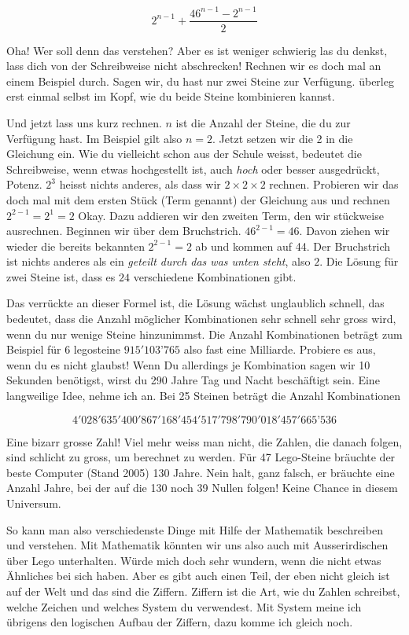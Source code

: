 $$2^{n-1}+\frac{46^{n-1}-2^{n-1}}{2}$$

Oha! Wer soll denn das verstehen? Aber es ist weniger schwierig las du denkst, lass dich von der Schreibweise nicht abschrecken! Rechnen wir es doch mal an einem Beispiel durch. Sagen wir, du hast nur zwei Steine zur Verfügung. überleg erst einmal selbst im Kopf, wie du beide Steine kombinieren kannst.

Und jetzt lass uns kurz rechnen. $n$ ist die Anzahl der Steine, die du zur Verfügung hast. Im Beispiel gilt also $n=2$. Jetzt setzen wir die 2 in die Gleichung ein. Wie du vielleicht schon aus der Schule weisst, bedeutet die Schreibweise, wenn etwas hochgestellt ist, auch \textit{hoch} oder besser ausgedrückt, Potenz. $2^3$ heisst nichts anderes, als dass wir $2\times2\times2$ rechnen. Probieren wir das doch mal mit dem ersten Stück (Term genannt) der Gleichung aus und rechnen $2^{2-1}=2^1=2$ Okay. Dazu addieren wir den zweiten Term, den wir stückweise ausrechnen. Beginnen wir über dem Bruchstrich. $46^{2-1}=46$. Davon ziehen wir wieder die bereits bekannten $2^{2-1}=2$ ab und kommen auf 44. Der Bruchstrich ist nichts anderes als ein \textit{geteilt durch das was unten steht}, also $2$. Die Lösung für zwei Steine ist, dass es $24$ verschiedene Kombinationen gibt.

Das verrückte an dieser Formel ist, die Lösung wächst unglaublich schnell, das bedeutet, dass die Anzahl möglicher Kombinationen sehr schnell sehr gross wird, wenn du nur wenige Steine hinzunimmst. Die Anzahl Kombinationen beträgt zum Beispiel für 6 legosteine $915'103’765$ also fast eine Milliarde. Probiere es aus, wenn du es nicht glaubst! Wenn Du allerdings je Kombination sagen wir 10 Sekunden benötigst, wirst du 290 Jahre Tag und Nacht beschäftigt sein. Eine langweilige Idee, nehme ich an. Bei 25 Steinen beträgt die Anzahl Kombinationen

\begin{footnotesize}
$$4'028'635'400'867'168'454'517'798'790'018'457'665’536$$
\end{footnotesize}

Eine bizarr grosse Zahl! Viel mehr weiss man nicht, die Zahlen, die danach folgen, sind schlicht zu gross, um berechnet zu werden. Für 47 Lego-Steine bräuchte der beste Computer (Stand 2005) 130 Jahre. Nein halt, ganz falsch, er bräuchte eine Anzahl Jahre, bei der auf die 130 noch 39 Nullen folgen! Keine Chance in diesem Universum.

So kann man also verschiedenste Dinge mit Hilfe der Mathematik beschreiben und verstehen. Mit Mathematik könnten wir uns also auch mit Ausserirdischen über Lego unterhalten. Würde mich doch sehr wundern, wenn die nicht etwas Ähnliches bei sich haben. Aber es gibt auch einen Teil, der eben nicht gleich ist auf der Welt und das sind die Ziffern. Ziffern ist die Art, wie du Zahlen schreibst, welche Zeichen und welches System du verwendest. Mit System meine ich übrigens den logischen Aufbau der Ziffern, dazu komme ich gleich noch.

